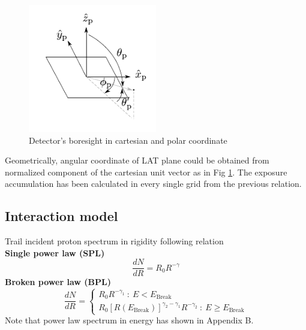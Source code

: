 \begin{figure}[h!]
    \centering
    \includegraphics[width=0.5\textwidth]{img/fig_coordinate/coord_plane.pdf}
    \caption{Detector's boresight in cartesian and polar coordinate}
    \label{fig:tf_lat_pol_car}
\end{figure}

Geometrically, angular coordinate of LAT plane could be obtained from normalized component of the cartesian unit vector as in Fig \ref{fig:tf_lat_pol_car}.
The exposure accumulation has been calculated in every single grid from the previous relation.


\subsection{Interaction model}
Trail incident proton spectrum in rigidity following relation \\
\textbf{Single power law (SPL)}
\begin{equation}
\frac{dN}{dR} = R_0R^{-\gamma}
\end{equation}
\textbf{Broken power law (BPL)}
\begin{equation}
\frac{dN}{dR}=
  \begin{cases}
    R_0R^{-\gamma_1}\ :\ E < E_{\text{Break}}\\
    R_0[R(E_{\text{Break}})]^{\gamma_2-\gamma_1}R^{-\gamma_2}\ :\ E \ge E_{\text{Break}}
  \end{cases}
\end{equation}
Note that power law spectrum in energy has shown in Appendix B.

